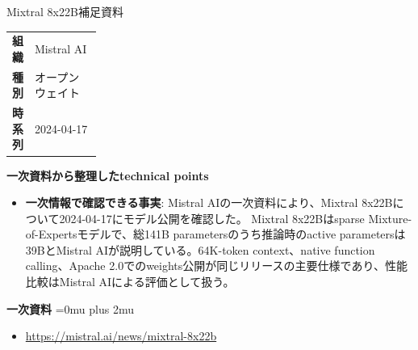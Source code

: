 \begin{technicalnote}{Mixtral 8x22B}{補足資料}
\begingroup
\begin{tabularx}{\linewidth}{@{}>{\bfseries}p{0.22\linewidth}X@{}}
組織 & Mistral AI \\
種別 & オープンウェイト \\
時系列 & 2024-04-17 \\
\end{tabularx}
\smallskip
\begin{minipage}{\linewidth}
{\bfseries 一次資料から整理したtechnical points}
\begin{itemize}[leftmargin=1.5em,itemsep=0.35em]
\item \textbf{一次情報で確認できる事実}: Mistral AIの一次資料により、Mixtral 8x22Bについて2024-04-17にモデル公開を確認した。 Mixtral 8x22Bはsparse Mixture-of-Expertsモデルで、総141B parametersのうち推論時のactive parametersは39BとMistral AIが説明している。64K-token context、native function calling、Apache 2.0でのweights公開が同じリリースの主要仕様であり、性能比較はMistral AIによる評価として扱う。
\end{itemize}
\begin{minipage}{\linewidth}
\begin{samepage}
{\bfseries 一次資料}
\begingroup\sloppy
\Urlmuskip=0mu plus 2mu\relax
\begin{itemize}[leftmargin=1.5em,itemsep=0.25em]
\item {\scriptsize\url{https://mistral.ai/news/mixtral-8x22b}}
\end{itemize}
\endgroup
\end{samepage}
\end{minipage}
\end{minipage}
\endgroup
\end{technicalnote}
\medskip

